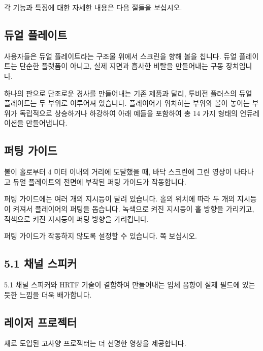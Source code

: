 \documentclass[10pt, openright, language=korean]{hzguide}
\begin{document}
각 기능과 특징에 대한 자세한 내용은 다음 절들을 보십시오.

\newpage
\subsection{듀얼 플레이트}

사용자들은 듀얼 플레이트라는 구조물 위에서 스크린을 향해 볼을 칩니다. 듀얼 플레이트는 단순한 플랫폼이 아니고, 실제 지면과 흡사한 비탈을 만들어내는 구동 장치입니다.

하나의 판으로 단조로운 경사를 만들어내는 기존 제품과 달리, 투비전 플러스의 듀얼 플레이트는 두 부위로 이루어져 있습니다. 플레이어가 위치하는 부위와 볼이 놓이는 부위가 독립적으로 상승하거나 하강하여 아래 예들을 포함하여 총 14 가지 형태의 언듀레이션을 만들어냅니다.


\newpage
\subsection{퍼팅 가이드}
\label{sec:putting_guide}

볼이 홀로부터 4 미터 이내의 거리에 도달했을 때, 바닥 스크린에 그린 영상이 나타나고 듀얼 플레이트의 전면에 부착된 퍼팅 가이드가 작동합니다.


퍼팅 가이드에는 여러 개의 지시등이 달려 있습니다.
홀의 위치에 따라 두 개의 지시등이 켜져서 플레이어의 퍼팅을 돕습니다.
녹색으로 켜진 지시등이 홀 방향을 가리키고, 적색으로 켜진 지시등이 퍼팅 방향을 가리킵니다.

퍼팅 가이드가 작동하지 않도록 설정할 수 있습니다. 
\pageref{sec:admin_setting_default} 쪽 \를 보십시오.

\subsection{5.1 채널 스피커}


5.1 채널 스피커와 HRTF 기술이 결합하여 만들어내는 입체 음향이 실제 필드에 있는 듯한 느낌을 더욱 배가합니다.

\subsection{레이저 프로젝터}

새로 도입된 고사양 프로젝터는 더 선명한 영상을 제공합니다.
\end{document}
